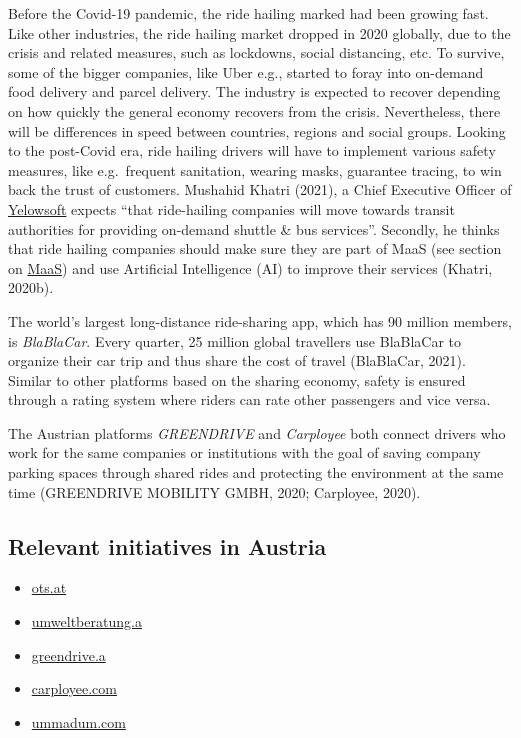 \documentclass[
]{book}
\providecommand{\tightlist}{%
  \setlength{\itemsep}{0pt}\setlength{\parskip}{0pt}}
\begin{document}
Before the Covid-19 pandemic, the ride hailing marked had been growing fast. Like other industries, the ride hailing market dropped in 2020 globally, due to the crisis and related measures, such as lockdowns, social distancing, etc. To survive, some of the bigger companies, like Uber e.g., started to foray into on-demand food delivery and parcel delivery. The industry is expected to recover depending on how quickly the general economy recovers from the crisis. Nevertheless, there will be differences in speed between countries, regions and social groups. Looking to the post-Covid era, ride hailing drivers will have to implement various safety measures, like e.g.~frequent sanitation, wearing masks, guarantee tracing, to win back the trust of customers. Mushahid Khatri (2021), a Chief Executive Officer of \href{https://www.yelowsoft.com/}{Yelowsoft} expects ``that ride-hailing companies will move towards transit authorities for providing on-demand shuttle \& bus services''. Secondly, he thinks that ride hailing companies should make sure they are part of MaaS (see section on \protect\hyperlink{maas}{MaaS}) and use Artificial Intelligence (AI) to improve their services (Khatri, 2020b).

The world's largest long-distance ride-sharing app, which has 90 million members, is \emph{BlaBlaCar}. Every quarter, 25 million global travellers use BlaBlaCar to organize their car trip and thus share the cost of travel (BlaBlaCar, 2021). Similar to other platforms based on the sharing economy, safety is ensured through a rating system where riders can rate other passengers and vice versa.

The Austrian platforms \emph{GREENDRIVE} and \emph{Carployee} both connect drivers who work for the same companies or institutions with the goal of saving company parking spaces through shared rides and protecting the environment at the same time (GREENDRIVE MOBILITY GMBH, 2020; Carployee, 2020).

\hypertarget{relevant-initiatives-in-austria-34}{%
\subsection*{Relevant initiatives in Austria}\label{relevant-initiatives-in-austria-34}}

\begin{itemize}
\tightlist
\item
  \href{https://www.ots.at/presseaussendung/OTS_20210113_OTS0026/free-now-will-als-erste-mobilitaetsplattform-in-europa-bis-2030-null-emissionen-erreichen}{ots.at}
\item
  \href{https://www.umweltberatung.at/carsharing-mitfahrboersen}{umweltberatung.a}
\item
  \href{https://greendrive.at/premium/\#benefits}{greendrive.a}
\item
  \href{https://www.carployee.com/\#start-section}{carployee.com}
\item
  \href{https://ummadum.com/}{ummadum.com}
\end{itemize}
\end{document}
